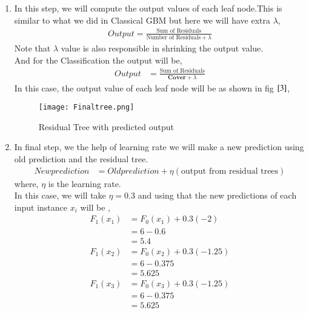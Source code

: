 \documentclass[journal,12pt,onecolumn]{IEEEtran}
\providecommand{\brak}[1]{\ensuremath{\left(#1\right)}}
\theoremstyle{remark}
\numberwithin{equation}{section}
\begin{document}
\begin{enumerate}
	   \item In this step, we will compute the output values of each leaf node.This is similar to what we did in Classical GBM but here we will have extra $\lambda$,
		   \begin{align}
			   Output = \frac{\text{Sum of Residuals}}{\text{Number of Residuals} + \lambda}
		   \end{align}
		   Note that $\lambda$ value is also responsible in shrinking the output value.\\
                   And for the Classification the output will be,
		   \begin{align}
			   Output &= \frac{\text{Sum of Residuals}}{\mathbf{Cover} + \lambda}
		   \end{align}
            In this case, the output value of each leaf node will be as shown in fig $\ref{3}$,
	           \begin{figure}
		     \centering
		     \texttt{[image: Finaltree.png]}
		     \caption{Residual Tree with predicted output}
		     \label{3}
	            \end{figure}
	    \item In final step, we the help of learning rate we will make a new prediction using old prediction and the residual tree.
		    \begin{align}
			    New prediction &= Old prediction + \eta\brak{\text{output from residual trees}}
		    \end{align}
		       where, $\eta$ is the learning rate.\\
		     In this case, we will take $\eta = 0.3$ and using that the new predictions of each input instance $x_i$ will be ,
		       \begin{align}
			       F_{1}\brak{x_1} &= F_{0}\brak{x_1} + 0.3\brak{-2}\nonumber\\
			                       &= 6 - 0.6\nonumber\\
					       &= 5.4 \\
			       F_{1}\brak{x_2} &= F_{0}\brak{x_2} + 0.3\brak{-1.25}\nonumber \\
			                       &= 6 - 0.375\nonumber\\
					       &= 5.625\\
			       F_{1}\brak{x_3} &= F_{0}\brak{x_3} + 0.3\brak{-1.25}\nonumber \\
			                       &= 6 - 0.375\nonumber\\
                                               &= 5.625\\

\end{align}
\end{enumerate}
\end{document}
